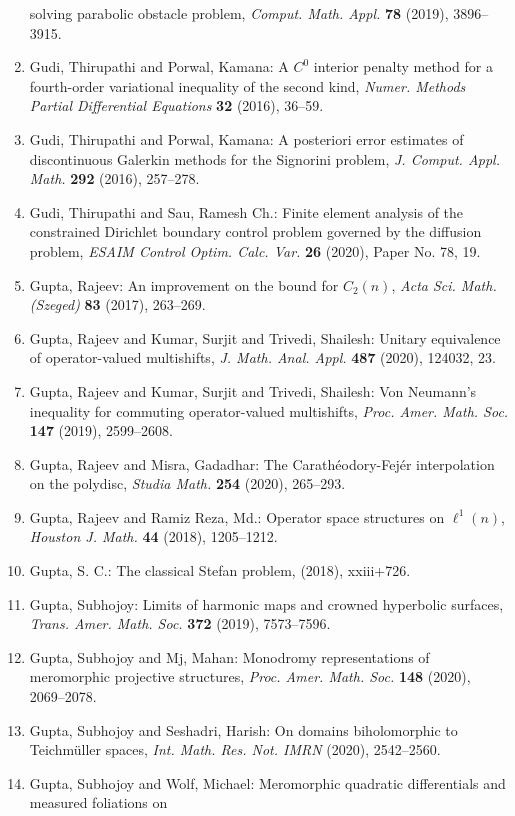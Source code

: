 \begin{enumerate}
solving parabolic obstacle problem, \emph{Comput. Math. Appl.} {\bf 78} (2019), 3896--3915.
\item Gudi, Thirupathi and Porwal, Kamana: A {$C^0$} interior penalty method for a fourth-order
variational inequality of the second kind, \emph{Numer. Methods Partial Differential Equations} {\bf 32} (2016), 36--59.
\item Gudi, Thirupathi and Porwal, Kamana: A posteriori error estimates of discontinuous {G}alerkin
methods for the {S}ignorini problem, \emph{J. Comput. Appl. Math.} {\bf 292} (2016), 257--278.
\item Gudi, Thirupathi and Sau, Ramesh Ch.: Finite element analysis of the constrained {D}irichlet
boundary control problem governed by the diffusion problem, \emph{ESAIM Control Optim. Calc. Var.} {\bf 26} (2020), Paper No. 78, 19.
\item Gupta, Rajeev: An improvement on the bound for {$C_2(n)$}, \emph{Acta Sci. Math. (Szeged)} {\bf 83} (2017), 263--269.
\item Gupta, Rajeev and Kumar, Surjit and Trivedi, Shailesh: Unitary equivalence of operator-valued multishifts, \emph{J. Math. Anal. Appl.} {\bf 487} (2020), 124032, 23.
\item Gupta, Rajeev and Kumar, Surjit and Trivedi, Shailesh: Von {N}eumann's inequality for commuting operator-valued
multishifts, \emph{Proc. Amer. Math. Soc.} {\bf 147} (2019), 2599--2608.
\item Gupta, Rajeev and Misra, Gadadhar: The {C}arath\'{e}odory-{F}ej\'{e}r interpolation on the polydisc, \emph{Studia Math.} {\bf 254} (2020), 265--293.
\item Gupta, Rajeev and Ramiz Reza, Md.: Operator space structures on {$\ell^1(n)$}, \emph{Houston J. Math.} {\bf 44} (2018), 1205--1212.
\item Gupta, S. C.: The classical {S}tefan problem, \emph{} {\bf } (2018), xxiii+726.
\item Gupta, Subhojoy: Limits of harmonic maps and crowned hyperbolic surfaces, \emph{Trans. Amer. Math. Soc.} {\bf 372} (2019), 7573--7596.
\item Gupta, Subhojoy and Mj, Mahan: Monodromy representations of meromorphic projective
structures, \emph{Proc. Amer. Math. Soc.} {\bf 148} (2020), 2069--2078.
\item Gupta, Subhojoy and Seshadri, Harish: On domains biholomorphic to {T}eichm\"{u}ller spaces, \emph{Int. Math. Res. Not. IMRN} {\bf } (2020), 2542--2560.
\item Gupta, Subhojoy and Wolf, Michael: Meromorphic quadratic differentials and measured foliations on

\end{enumerate}
